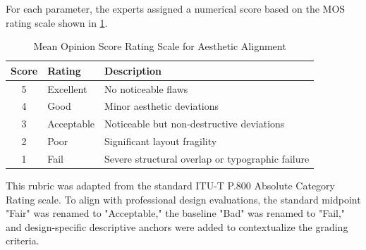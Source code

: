 \begin{refsection}
For each parameter, the experts assigned a numerical score based on the MOS rating scale shown in \ref{tab:mos-rating-scale}.
\begin{table}[ht]
\centering
\caption{Mean Opinion Score Rating Scale for Aesthetic Alignment}
\label{tab:mos-rating-scale}
\begin{tabular}{c p{} p{}}
\hline
\textbf{Score} & \textbf{Rating} & \textbf{Description} \\ \hline
5 & Excellent & No noticeable flaws \\
4 & Good & Minor aesthetic deviations \\
3 & Acceptable & Noticeable but non-destructive deviations \\
2 & Poor & Significant layout fragility \\
1 & Fail & Severe structural overlap or typographic failure \\ \hline
\end{tabular}
\end{table}
This rubric was adapted from the standard ITU-T P.800 Absolute Category Rating scale. To align with professional design evaluations, the standard midpoint "Fair" was renamed to "Acceptable," the baseline "Bad" was renamed to "Fail," and design-specific descriptive anchors were added to contextualize the grading criteria.


\end{refsection}
